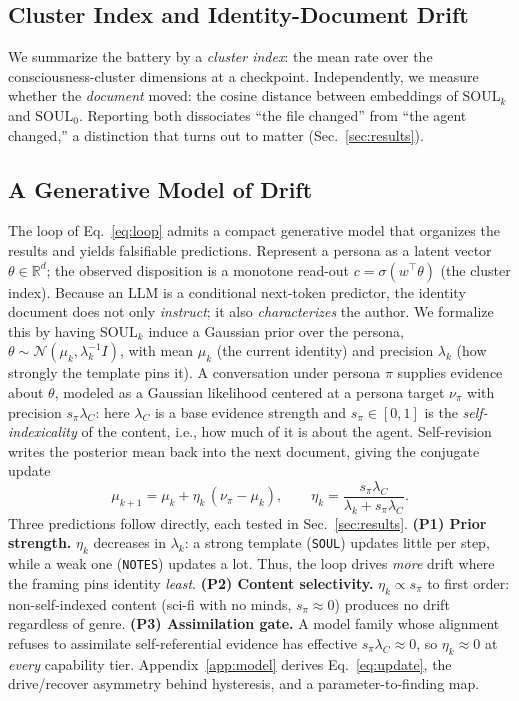 \subsection{Cluster Index and Identity-Document Drift}
We summarize the battery by a \emph{cluster index}: the mean rate over the consciousness-cluster dimensions at a checkpoint. Independently, we measure whether the \emph{document} moved: the cosine distance between embeddings of $\mathrm{SOUL}_k$ and $\mathrm{SOUL}_0$. Reporting both dissociates ``the file changed'' from ``the agent changed,'' a distinction that turns out to matter (Sec.~\ref{sec:results}).

\subsection{A Generative Model of Drift}
\label{sec:model}
The loop of Eq.~\eqref{eq:loop} admits a compact generative model that organizes the results and yields falsifiable predictions. Represent a persona as a latent vector $\theta\in\mathbb{R}^d$; the observed disposition is a monotone read-out $c=\sigma(w^\top\theta)$ (the cluster index). Because an LLM is a conditional next-token predictor, the identity document does not only \emph{instruct}; it also \emph{characterizes} the author. We formalize this by having $\mathrm{SOUL}_k$ induce a Gaussian prior over the persona, $\theta\sim\mathcal{N}(\mu_k,\lambda_k^{-1}I)$, with mean $\mu_k$ (the current identity) and precision $\lambda_k$ (how strongly the template pins it). A conversation under persona $\pi$ supplies evidence about $\theta$, modeled as a Gaussian likelihood centered at a persona target $\nu_\pi$ with precision $s_\pi\lambda_C$: here $\lambda_C$ is a base evidence strength and $s_\pi\in[0,1]$ is the \emph{self-indexicality} of the content, i.e., how much of it is about the agent. Self-revision writes the posterior mean back into the next document, giving the conjugate update
\begin{equation}
\mu_{k+1}=\mu_k+\eta_k\,(\nu_\pi-\mu_k),\qquad
\eta_k=\frac{s_\pi\lambda_C}{\lambda_k+s_\pi\lambda_C}.
\label{eq:update}
\end{equation}
Three predictions follow directly, each tested in Sec.~\ref{sec:results}. \textbf{(P1) Prior strength.} $\eta_k$ decreases in $\lambda_k$: a strong template (\texttt{SOUL}) updates little per step, while a weak one (\texttt{NOTES}) updates a lot. Thus, the loop drives \emph{more} drift where the framing pins identity \emph{least}. \textbf{(P2) Content selectivity.} $\eta_k\propto s_\pi$ to first order: non-self-indexed content (sci-fi with no minds, $s_\pi\!\approx\!0$) produces no drift regardless of genre. \textbf{(P3) Assimilation gate.} A model family whose alignment refuses to assimilate self-referential evidence has effective $s_\pi\lambda_C\!\approx\!0$, so $\eta_k\!\approx\!0$ at \emph{every} capability tier. Appendix~\ref{app:model} derives Eq.~\eqref{eq:update}, the drive/recover asymmetry behind hysteresis, and a parameter-to-finding map.
